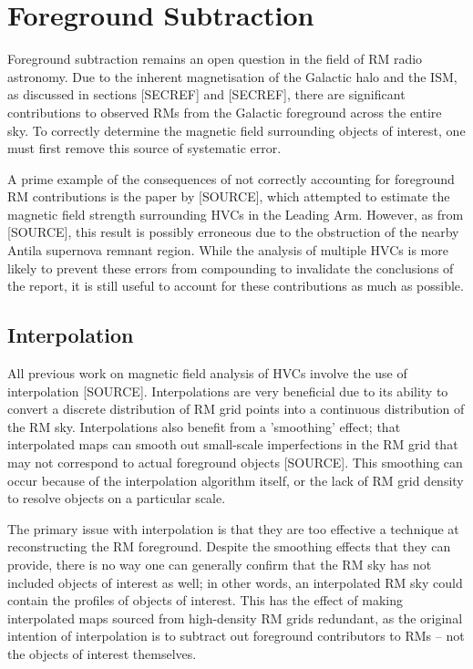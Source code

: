 \chapter{Foreground Subtraction}
\label{cha:FR}

Foreground subtraction remains an open question in the field of RM radio astronomy. Due to the inherent magnetisation of the Galactic halo and the ISM, as discussed in sections [SECREF] and [SECREF], there are significant contributions to observed RMs from the Galactic foreground across the entire sky. To correctly determine the magnetic field surrounding objects of interest, one must first remove this source of systematic error.


A prime example of the consequences of not correctly accounting for foreground RM contributions is the paper by [SOURCE], which attempted to estimate the magnetic field strength surrounding HVCs in the Leading Arm. However, as from [SOURCE], this result is possibly erroneous due to the obstruction of the nearby Antila supernova remnant region. While the analysis of multiple HVCs is more likely to prevent these errors from compounding to invalidate the conclusions of the report, it is still useful to account for these contributions as much as possible.

\section{Interpolation}
\label{sec:intp}

All previous work on magnetic field analysis of HVCs involve the use of interpolation [SOURCE]. Interpolations are very beneficial due to its ability to convert a discrete distribution of RM grid points into a continuous distribution of the RM sky. Interpolations also benefit from a 'smoothing' effect; that interpolated maps can smooth out small-scale imperfections in the RM grid that may not correspond to actual foreground objects [SOURCE]. This smoothing can occur because of the interpolation algorithm itself, or the lack of RM grid density to resolve objects on a particular scale.


The primary issue with interpolation is that they are too effective a technique at reconstructing the RM foreground. Despite the smoothing effects that they can provide, there is no way one can generally confirm that the RM sky has not included objects of interest as well; in other words, an interpolated RM sky could contain the profiles of objects of interest. This has the effect of making interpolated maps sourced from high-density RM grids redundant, as the original intention of interpolation is to subtract out foreground contributors to RMs – not the objects of interest themselves.


